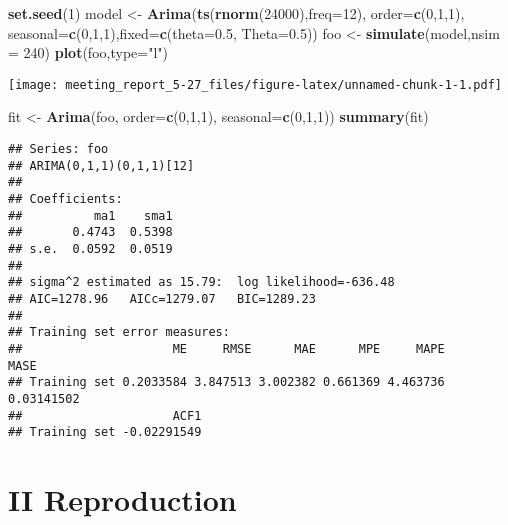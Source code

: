 \documentclass[]{article}
\newenvironment{Shaded}{\begin{snugshade}}{\end{snugshade}}
\newcommand{\DataTypeTok}[1]{\textcolor[rgb]{0.13,0.29,0.53}{#1}}
\newcommand{\DecValTok}[1]{\textcolor[rgb]{0.00,0.00,0.81}{#1}}
\newcommand{\FloatTok}[1]{\textcolor[rgb]{0.00,0.00,0.81}{#1}}
\newcommand{\KeywordTok}[1]{\textcolor[rgb]{0.13,0.29,0.53}{\textbf{#1}}}
\newcommand{\NormalTok}[1]{#1}
\newcommand{\StringTok}[1]{\textcolor[rgb]{0.31,0.60,0.02}{#1}}
\begin{document}
\begin{Shaded}
\begin{Highlighting}[]
\KeywordTok{set.seed}\NormalTok{(}\DecValTok{1}\NormalTok{)}
\NormalTok{model <-}\StringTok{ }\KeywordTok{Arima}\NormalTok{(}\KeywordTok{ts}\NormalTok{(}\KeywordTok{rnorm}\NormalTok{(}\DecValTok{24000}\NormalTok{),}\DataTypeTok{freq=}\DecValTok{12}\NormalTok{), }\DataTypeTok{order=}\KeywordTok{c}\NormalTok{(}\DecValTok{0}\NormalTok{,}\DecValTok{1}\NormalTok{,}\DecValTok{1}\NormalTok{), }\DataTypeTok{seasonal=}\KeywordTok{c}\NormalTok{(}\DecValTok{0}\NormalTok{,}\DecValTok{1}\NormalTok{,}\DecValTok{1}\NormalTok{),}\DataTypeTok{fixed=}\KeywordTok{c}\NormalTok{(}\DataTypeTok{theta=}\FloatTok{0.5}\NormalTok{, }\DataTypeTok{Theta=}\FloatTok{0.5}\NormalTok{))}
\NormalTok{foo <-}\StringTok{ }\KeywordTok{simulate}\NormalTok{(model,}\DataTypeTok{nsim =} \DecValTok{240}\NormalTok{)}
\KeywordTok{plot}\NormalTok{(foo,}\DataTypeTok{type=}\StringTok{"l"}\NormalTok{)}
\end{Highlighting}
\end{Shaded}

\texttt{[image: meeting\_report\_5-27\_files/figure-latex/unnamed-chunk-1-1.pdf]}

\begin{Shaded}
\begin{Highlighting}[]
\NormalTok{fit <-}\StringTok{ }\KeywordTok{Arima}\NormalTok{(foo, }\DataTypeTok{order=}\KeywordTok{c}\NormalTok{(}\DecValTok{0}\NormalTok{,}\DecValTok{1}\NormalTok{,}\DecValTok{1}\NormalTok{), }\DataTypeTok{seasonal=}\KeywordTok{c}\NormalTok{(}\DecValTok{0}\NormalTok{,}\DecValTok{1}\NormalTok{,}\DecValTok{1}\NormalTok{))}
\KeywordTok{summary}\NormalTok{(fit)}
\end{Highlighting}
\end{Shaded}

\begin{verbatim}
## Series: foo 
## ARIMA(0,1,1)(0,1,1)[12] 
## 
## Coefficients:
##          ma1    sma1
##       0.4743  0.5398
## s.e.  0.0592  0.0519
## 
## sigma^2 estimated as 15.79:  log likelihood=-636.48
## AIC=1278.96   AICc=1279.07   BIC=1289.23
## 
## Training set error measures:
##                     ME     RMSE      MAE      MPE     MAPE       MASE
## Training set 0.2033584 3.847513 3.002382 0.661369 4.463736 0.03141502
##                     ACF1
## Training set -0.02291549
\end{verbatim}

\hypertarget{ii-reproduction}{%
\section{II Reproduction}\label{ii-reproduction}}
\end{document}

